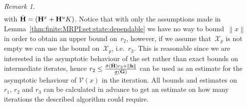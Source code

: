 \documentclass[journal]{IEEEtran}
\providecommand{\norm}[1]{\left\|#1\right\|}
\newcounter{thmcount}
\theoremstyle{remark}
\newtheorem{rem}[thmcount]{Remark}
\theoremstyle{definition}
\begin{document}
{\begin{rem}
\begin{multline}
\end{multline}
%
with $\bar{\bf{H}} = ({\bf{H}}^x + {\bf{H}}^u K)$.
%
Notice that with only the assumptions made in Lemma~\ref{thm:finite:MRPI:set:state:dependable}
we have no way to bound~$\norm{x}$ in order to obtain an upper bound on~$r_2$,
however, if we assume that~$\mathcal X_p$ is not empty we can use the bound on~$\mathcal X_p$, i.e.~$r_3$.
%
This is reasonable since we are interested in the asymptotic behaviour of the set rather than
exact bounds on intermediate iterates, hence $r_2\leq\frac{\bar\sigma(\bar{\bf{H}})r_3+\norm{{\bf{h}}}}
{\underline\sigma({\bf{G}})}$ can be used as an estimate for the asymptotic behaviour of $\mathcal V(x)$
in the iteration.
%
All bounds and estimates on $r_1,\,r_2$ and $r_3$ can be calculated in advance to get an estimate
on how many iterations the described algorithm could require.
\end{rem}}
%
%
%
%
%
\end{document}
